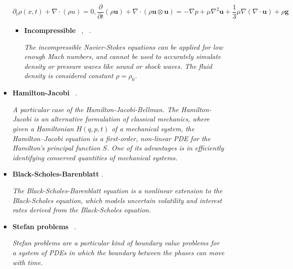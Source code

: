 \documentclass[12pt,letterpaper]{article}
\begin{document}
\begin{itemize}
\begin{itemize}
\begin{itemize}
                $$ \partial_t \rho (x,t) + \nabla \cdot (\rho u) = 0, \frac{\partial}{\partial t}(\rho \mathbf{u})+\nabla \cdot(\rho \mathbf{u} \otimes \mathbf{u})=-\nabla p+\mu \nabla^2 \mathbf{u}+\frac{1}{3} \mu \nabla(\nabla \cdot \mathbf{u})+\rho \mathbf{g}
                $$
                
                \begin{itemize} 
                    \item \textbf{Incompressible} ~\cite{leongVariationalQuantumEvolution2022},  ~\cite{lapworthHybridQuantumClassicalCFD2022}.

                    \textit{The incompressible Navier-Stokes equations can be applied for low enough Mach numbers, and cannot be used to accurately simulate density or pressure waves like sound or shock waves. The fluid density is considered constant $\rho = \rho_0$.}
                \end{itemize}
    
                \item \textbf{Hamilton-Jacobi}  ~\cite{jinTimeComplexityAnalysis2022,jinQuantumAlgorithmsComputing2022}.
                
                \textit{A particular case of the Hamilton-Jacobi-Bellman. The Hamilton-Jacobi is an alternative formulation of classical mechanics, where given a Hamiltonian $H( q , p , t )$ of a mechanical system, the Hamilton–Jacobi equation is a first-order, non-linear PDE for the Hamilton's principal function $S$. One of its advantages is in efficiently identifying conserved quantities of mechanical systems.}


                \item \textbf{Black-Scholes-Barenblatt}  \cite{patelQuantumInspiredTensorNeural2022}.
                
                \textit{The Black-Scholes-Barenblatt equation is a nonlinear extension to the Black-Scholes equation, which models uncertain volatility and interest rates derived from the Black-Scholes equation.}

                \item \textbf{Stefan problems}  ~\cite{sarsengeldinHybridClassicalQuantumFramework2022}.
                
                \textit{Stefan problems are a particular kind of boundary value problems for a system of PDEs in which the boundary between the phases can move with time.}
                

\end{itemize}
\end{itemize}
\end{itemize}
\end{document}
